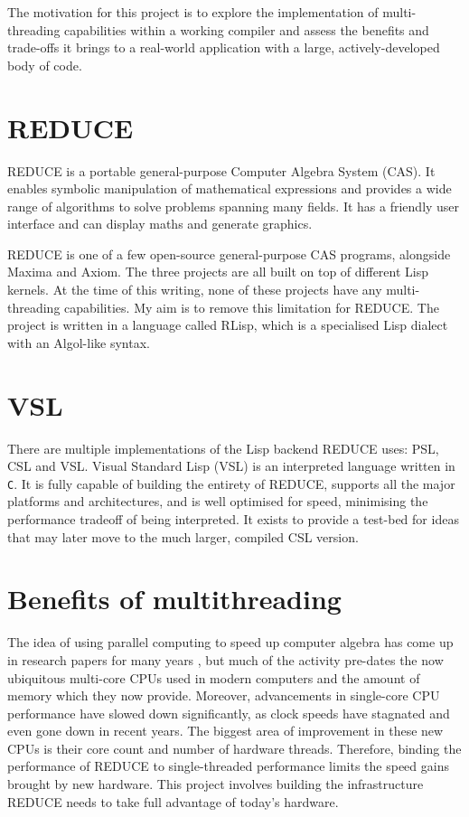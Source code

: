 The motivation for this project is to explore the implementation of multi-threading
capabilities within a working compiler and assess the benefits and trade-offs it brings
to a real-world application with a large, actively-developed body of code.

\section{REDUCE}

REDUCE \cite{reduce} is a portable general-purpose Computer Algebra System (CAS). It enables symbolic
manipulation of mathematical expressions and provides a wide range of algorithms
to solve problems spanning many fields.
It has a friendly user interface and can display maths and generate graphics.

REDUCE is one of a few open-source general-purpose CAS programs, alongside Maxima and Axiom.
The three projects are all built on top of different Lisp kernels. At the time of this writing,
none of these projects have any multi-threading capabilities. My aim is to remove this limitation
for REDUCE. The project is written in a language called RLisp, which is a specialised
Lisp dialect with an Algol-like syntax.

\section{VSL}

There are multiple implementations of the Lisp backend REDUCE uses: PSL, CSL and VSL.
Visual Standard Lisp (VSL) is an interpreted language written
in \texttt{C}. It is fully capable of building the entirety of REDUCE, supports all the major
platforms and architectures, and is well optimised for speed, minimising the performance tradeoff
of being interpreted. It exists to provide a test-bed for ideas that may later move to the much larger,
compiled CSL version.

\section{Benefits of multithreading}
The idea of using parallel computing to speed up computer algebra has come
up in research papers for many years \cite{algebra-parallelism},
but much of the activity
pre-dates the now ubiquitous multi-core CPUs used in modern computers and the amount of memory
which they now provide. Moreover, advancements in single-core CPU performance have slowed down
significantly, as clock speeds have stagnated and even gone down in recent years. The biggest
area of improvement in these new CPUs is their core count and number of hardware threads.
Therefore, binding the performance of REDUCE to single-threaded performance limits the speed gains
brought by new hardware. This project involves building the infrastructure
REDUCE needs to take full advantage of today's hardware.

